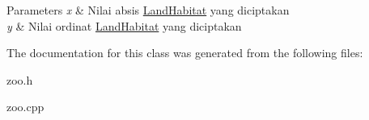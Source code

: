 \begin{DoxyParams}{Parameters}
{\em x} & Nilai absis \hyperlink{classLandHabitat}{Land\+Habitat} yang diciptakan \\
\hline
{\em y} & Nilai ordinat \hyperlink{classLandHabitat}{Land\+Habitat} yang diciptakan \\
\hline
\end{DoxyParams}


The documentation for this class was generated from the following files\+:\begin{DoxyCompactItemize}
\item 
zoo.\+h\item 
zoo.\+cpp\end{DoxyCompactItemize}

